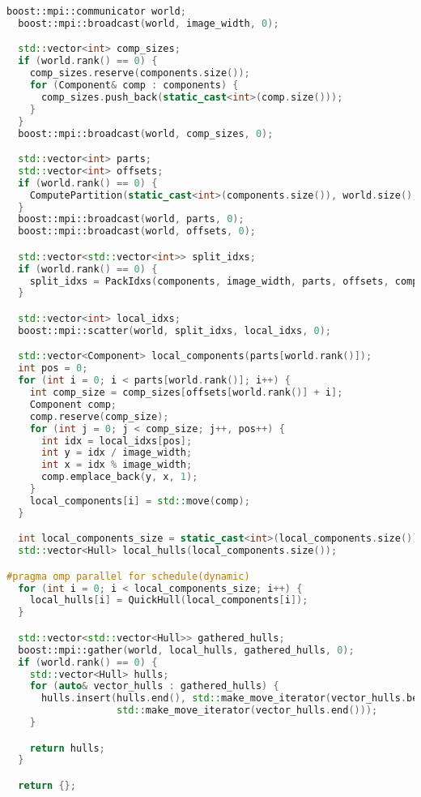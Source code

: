 \documentclass[12pt]{article}
\begin{document}
\begin{lstlisting}[language=C++, caption={MPI+OMP-версия, Построение оболочки для каждой из компонент в функции QuickHullAllMPIOMP()}]
  boost::mpi::communicator world;
  boost::mpi::broadcast(world, image_width, 0);

  std::vector<int> comp_sizes;
  if (world.rank() == 0) {
    comp_sizes.reserve(components.size());
    for (Component& comp : components) {
      comp_sizes.push_back(static_cast<int>(comp.size()));
    }
  }
  boost::mpi::broadcast(world, comp_sizes, 0);

  std::vector<int> parts;
  std::vector<int> offsets;
  if (world.rank() == 0) {
    ComputePartition(static_cast<int>(components.size()), world.size(), parts, offsets);
  }
  boost::mpi::broadcast(world, parts, 0);
  boost::mpi::broadcast(world, offsets, 0);

  std::vector<std::vector<int>> split_idxs;
  if (world.rank() == 0) {
    split_idxs = PackIdxs(components, image_width, parts, offsets, comp_sizes);
  }

  std::vector<int> local_idxs;
  boost::mpi::scatter(world, split_idxs, local_idxs, 0);

  std::vector<Component> local_components(parts[world.rank()]);
  int pos = 0;
  for (int i = 0; i < parts[world.rank()]; i++) {
    int comp_size = comp_sizes[offsets[world.rank()] + i];
    Component comp;
    comp.reserve(comp_size);
    for (int j = 0; j < comp_size; j++, pos++) {
      int idx = local_idxs[pos];
      int y = idx / image_width;
      int x = idx % image_width;
      comp.emplace_back(y, x, 1);
    }
    local_components[i] = std::move(comp);
  }

  int local_components_size = static_cast<int>(local_components.size());
  std::vector<Hull> local_hulls(local_components.size());

#pragma omp parallel for schedule(dynamic)
  for (int i = 0; i < local_components_size; i++) {
    local_hulls[i] = QuickHull(local_components[i]);
  }

  std::vector<std::vector<Hull>> gathered_hulls;
  boost::mpi::gather(world, local_hulls, gathered_hulls, 0);
  if (world.rank() == 0) {
    std::vector<Hull> hulls;
    for (auto& vector_hulls : gathered_hulls) {
      hulls.insert(hulls.end(), std::make_move_iterator(vector_hulls.begin()),
                   std::make_move_iterator(vector_hulls.end()));
    }

    return hulls;
  }

  return {};
\end{lstlisting}
\end{document}
